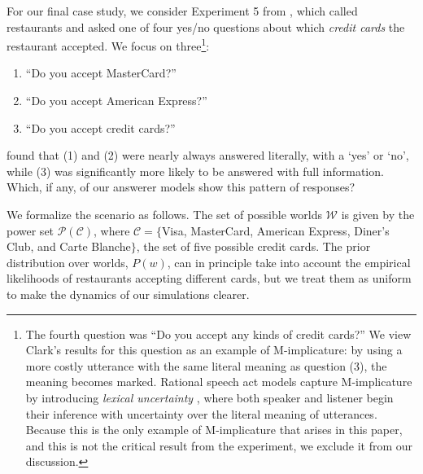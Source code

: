 \documentclass[11pt, floatsintext]{apa6}
\begin{document}
For our final case study, we consider Experiment 5 from , which called restaurants and asked one of four yes/no questions about which \emph{credit cards} the restaurant accepted. We focus on three\footnote{
The fourth question was ``Do you accept any kinds of credit cards?'' We view Clark's results for this question as an example of M-implicature: by using a more costly utterance with the same literal meaning as question (3), the meaning becomes marked. Rational speech act models capture M-implicature by introducing \emph{lexical uncertainty} \cite{BergenGoodmanLevy12_Alternatives}, where both speaker and listener begin their inference with uncertainty over the literal meaning of utterances. %
Because this is the only example of M-implicature that arises in this paper, and this is not the critical result from the experiment, we exclude it from our discussion.%
}:
\begin{enumerate}
\item ``Do you accept MasterCard?'' 
\item ``Do you accept American Express?''
\item ``Do you accept credit cards?'' 
\end{enumerate}
 found that (1) and (2) were nearly always answered literally, with a `yes' or `no', while (3) was significantly more likely to be answered with full information. Which, if any, of our answerer models show this pattern of responses? %

We formalize the scenario as follows. The set of possible worlds $\mathcal{W}$ is given by the power set $\mathcal{P}(\mathcal{C})$, where $\mathcal{C} = \{$Visa, MasterCard, American Express, Diner's Club, and Carte Blanche$\}$, the set of five possible credit cards. %
The prior distribution over worlds, $P(w)$, can in principle take into account the empirical likelihoods of restaurants accepting different cards, but we treat them as uniform to make the dynamics of our simulations clearer. %
\end{document}
